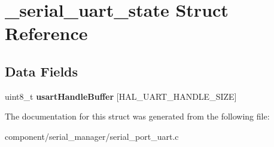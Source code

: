 \hypertarget{struct__serial__uart__state}{}\section{\+\_\+serial\+\_\+uart\+\_\+state Struct Reference}
\label{struct__serial__uart__state}
\subsection*{Data Fields}
\begin{DoxyCompactItemize}
\item 
\mbox{\label{struct__serial__uart__state_a0a1da5384c28be5eb6329b9f54d9c4d0}} 
uint8\+\_\+t {\bfseries usart\+Handle\+Buffer} \mbox{[}H\+A\+L\+\_\+\+U\+A\+R\+T\+\_\+\+H\+A\+N\+D\+L\+E\+\_\+\+S\+I\+ZE\mbox{]}
\end{DoxyCompactItemize}


The documentation for this struct was generated from the following file\+:\begin{DoxyCompactItemize}
\item 
component/serial\+\_\+manager/serial\+\_\+port\+\_\+uart.\+c\end{DoxyCompactItemize}
